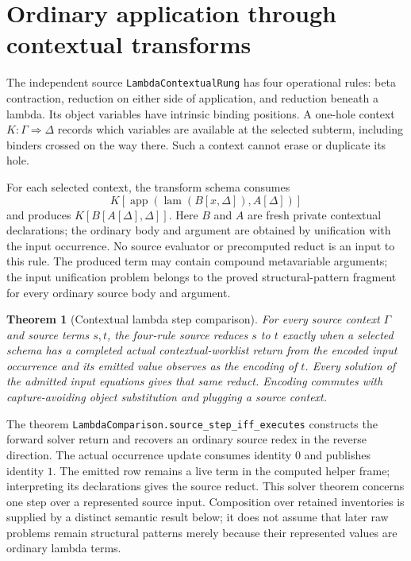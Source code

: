 \documentclass[11pt]{article}
\newtheorem{theorem}{Theorem}
\newcommand{\code}[1]{\texttt{\small #1}}
\begin{document}
\section{Ordinary application through contextual transforms}

The independent source \code{LambdaContextualRung} has four operational
rules: beta contraction, reduction on either side of application, and
reduction beneath a lambda. Its object variables have intrinsic binding
positions. A one-hole context $K:\Gamma\Rightarrow\Delta$ records which
variables are available at the selected subterm, including binders crossed
on the way there. Such a context cannot erase or duplicate its hole.

For each selected context, the transform schema consumes
\[
 K[\operatorname{app}(\operatorname{lam}(B[x,\Delta]),A[\Delta])]
\]
and produces $K[B[A[\Delta],\Delta]]$. Here $B$ and $A$ are fresh private
contextual declarations; the ordinary body and argument are obtained by
unification with the input occurrence. No source evaluator or precomputed
reduct is an input to this rule. The produced term may contain compound
metavariable arguments; the input unification problem belongs to the proved
structural-pattern fragment for every ordinary source body and argument.

\begin{theorem}[Contextual lambda step comparison]
For every source context $\Gamma$ and source terms $s,t$, the four-rule
source reduces $s$ to $t$ exactly when a selected schema has a completed
actual contextual-worklist return from the encoded input occurrence and
its emitted value observes as the encoding of $t$. Every solution of the
admitted input equations gives that same reduct. Encoding commutes with
capture-avoiding object substitution and plugging a source context.
\end{theorem}

The theorem \code{LambdaComparison.source\_step\_iff\_executes} constructs
the forward solver return and recovers an ordinary source redex in the
reverse direction. The actual occurrence update consumes identity $0$ and
publishes identity $1$. The emitted row remains a live term in the computed
helper frame; interpreting its declarations gives the source reduct.
This solver theorem concerns one step over a represented source input.
Composition over retained inventories is supplied by a distinct semantic
result below; it does not assume that later raw problems remain structural
patterns merely because their represented values are ordinary lambda terms.
\end{document}
